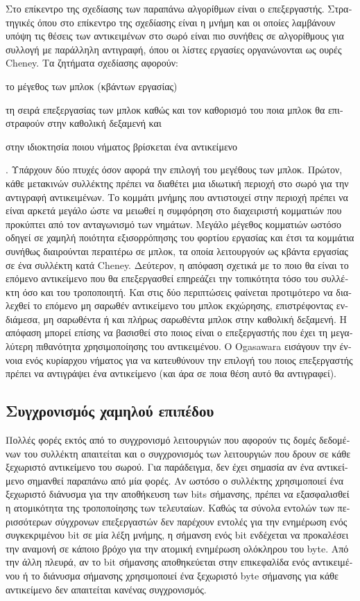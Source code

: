 \begin{greek}
Στο επίκεντρο της σχεδίασης των παραπάνω αλγορίθμων είναι ο
επεξεργαστής. Στρατηγικές όπου στο επίκεντρο της σχεδίασης
είναι η μνήμη και οι οποίες λαμβάνουν υπόψη τις θέσεις των
αντικειμένων στο σωρό είναι πιο συνήθεις σε αλγορίθμους για
συλλογή με παράλληλη αντιγραφή, όπου οι λίστες εργασίες
οργανώνονται ως ουρές Cheney. Τα ζητήματα σχεδίασης αφορούν:
\begin{inparaenum}[(i)]
\item το μέγεθος των μπλοκ (κβάντων εργασίας)
\item τη σειρά επεξεργασίας των μπλοκ καθώς και τον καθορισμό
      του ποια μπλοκ θα επιστραφούν στην καθολική δεξαμενή και
\item στην ιδιοκτησία ποιου νήματος βρίσκεται ένα αντικείμενο
\end{inparaenum}. 
Υπάρχουν δύο πτυχές όσον αφορά την επιλογή του μεγέθους των
μπλοκ. Πρώτον, κάθε μετακινών συλλέκτης πρέπει να διαθέτει
μια ιδιωτική περιοχή στο σωρό για την αντιγραφή αντικειμένων.
Το κομμάτι μνήμης που αντιστοιχεί στην περιοχή πρέπει να είναι
αρκετά μεγάλο ώστε να μειωθεί η συμφόρηση στο διαχειριστή
κομματιών που προκύπτει από τον ανταγωνισμό των νημάτων. Μεγάλο
μέγεθος κομματιών ωστόσο οδηγεί σε χαμηλή ποιότητα εξισορρόπησης
του φορτίου εργασίας και έτσι τα κομμάτια συνήθως διαιρούνται
περαιτέρω σε μπλοκ, τα οποία λειτουργούν ως κβάντα εργασίας
σε ένα συλλέκτη κατά Cheney. Δεύτερον, η απόφαση σχετικά με
το ποιο θα είναι το επόμενο αντικείμενο που θα επεξεργασθεί
επηρεάζει την τοπικότητα τόσο του συλλέκτη όσο και του τροποποιητή.
Και στις δύο περιπτώσεις φαίνεται προτιμότερο να διαλεχθεί
το επόμενο μη σαρωθέν αντικείμενο του μπλοκ εκχώρησης, επιστρέφοντας
ενδιάμεσα, μη σαρωθέντα ή και πλήρως σαρωθέντα μπλοκ στην
καθολική δεξαμενή. Η απόφαση μπορεί επίσης να βασισθεί στο
ποιος είναι ο επεξεργαστής που έχει τη μεγαλύτερη πιθανότητα
χρησιμοποίησης του αντικειμένου. Ο Ogasawara \cite{DBLP:conf/oopsla/Ogasawara09}
εισάγουν την έννοια ενός κυρίαρχου νήματος για να κατευθύνουν
την επιλογή του ποιος επεξεργαστής πρέπει να αντιγράψει ένα
αντικείμενο (και άρα σε ποια θέση αυτό θα αντιγραφεί).

\subsection{Συγχρονισμός χαμηλού επιπέδου}
Πολλές φορές εκτός από το συγχρονισμό λειτουργιών που αφορούν
τις δομές δεδομένων του συλλέκτη απαιτείται και ο συγχρονισμός
των λειτουργιών που δρουν σε κάθε ξεχωριστό αντικείμενο του
σωρού. Για παράδειγμα, δεν έχει σημασία αν ένα αντικείμενο
σημανθεί παραπάνω από μία φορές. Αν ωστόσο ο συλλέκτης χρησιμοποιεί
ένα ξεχωριστό διάνυσμα για την αποθήκευση των bits σήμανσης,
πρέπει να εξασφαλισθεί η ατομικότητα της τροποποίησης των
τελευταίων. Καθώς τα σύνολα εντολών των περισσότερων σύγχρονων
επεξεργαστών δεν παρέχουν εντολές για την ενημέρωση ενός συγκεκριμένου
bit σε μία λέξη μνήμης, η σήμανση ενός bit ενδέχεται να προκαλέσει
την αναμονή σε κάποιο βρόχο για την ατομική ενημέρωση ολόκληρου
του byte. Από την άλλη πλευρά, αν το bit σήμανσης αποθηκεύεται
στην επικεφαλίδα ενός αντικειμένου ή το διάνυσμα σήμανσης
χρησιμοποιεί ένα ξεχωριστό byte σήμανσης για κάθε αντικείμενο
δεν απαιτείται κανένας συγχρονισμός.


\end{greek}
